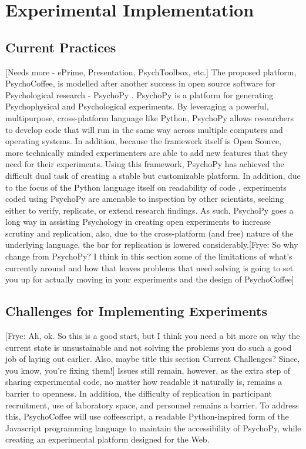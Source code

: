 \documentclass[12pt,a4paper,titlepage]{scrreprt}
\begin{document}
\section{Experimental Implementation}
\subsection{Current Practices}
[Needs more - ePrime, Presentation, PsychToolbox, etc.]
The proposed platform, PsychoCoffee, is modelled after another success in open source software for Psychological research - PsychoPy \parencite{peirce_psychopypsychophysics_2007,peirce_generating_2008}. PsychoPy is a platform for generating Psychophysical and Psychological experiments. By leveraging a powerful, multipurpose, cross-platform language like Python, PsychoPy allows researchers to develop code that will run in the same way across multiple computers and operating systems. In addition, because the framework itself is Open Source, more technically minded experimenters are able to add new features that they need for their experiments. Using this framework, PsychoPy has achieved the difficult dual task of creating a stable but customizable platform. In addition, due to the focus of the Python language itself on readability of code \parencite{_python_????}, experiments coded using PsychoPy are amenable to inspection by other scientists, seeking either to verify, replicate, or extend research findings. As such, PsychoPy goes a long way in assisting Psychology in creating open experiments to increase scrutiny and replication, also, due to the cross-platform (and free) nature of the underlying language, the bar for replication is lowered considerably.[Frye: So why change from PsychoPy? I think in this section some of the limitations of what's currently around and how that leaves problems that need solving is going to set you up for actually moving in your experiments and the design of PsychoCoffee]
\subsection{Challenges for Implementing Experiments}
[Frye: Ah, ok. So this is a good start, but I think you need a bit more on why the current state is unsustainable and not solving the problems you do such a good job of laying out earlier. Also, maybe title this section Current Challenges? Since, you know, you're fixing them!]
Issues still remain, however, as the extra step of sharing experimental code, no matter how readable it naturally is, remains a barrier to openness. In addition, the difficulty of replication in participant recruitment, use of laboratory space, and personnel remains a barrier. To address this, PsychoCoffee will use coffeescript, a readable Python-inspired form of the Javascript programming language to maintain the accessibility of PsychoPy, while creating an experimental platform designed for the Web.
\end{document}
